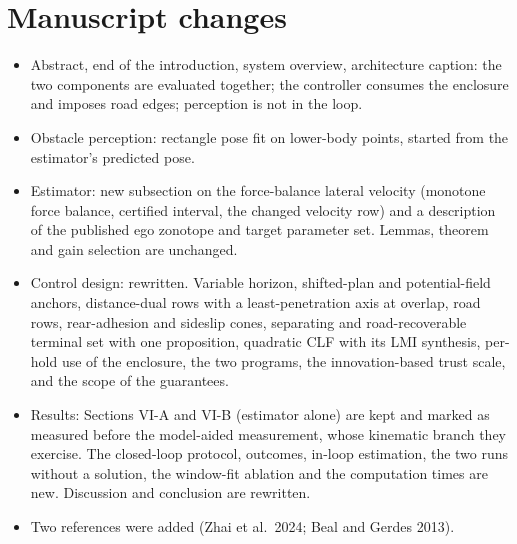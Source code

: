 \documentclass[11pt]{article}
\begin{document}
\section{Manuscript changes}
\begin{itemize}
\item Abstract, end of the introduction, system overview, architecture
  caption: the two components are evaluated together; the controller consumes
  the enclosure and imposes road edges; perception is not in the loop.
\item Obstacle perception: rectangle pose fit on lower-body points, started
  from the estimator's predicted pose.
\item Estimator: new subsection on the force-balance lateral velocity
  (monotone force balance, certified interval, the changed velocity row) and
  a description of the published ego zonotope and target parameter set.
  Lemmas, theorem and gain selection are unchanged.
\item Control design: rewritten. Variable horizon, shifted-plan and
  potential-field anchors, distance-dual rows with a least-penetration axis at
  overlap, road rows, rear-adhesion and sideslip cones, separating and
  road-recoverable terminal set with one proposition, quadratic CLF with its
  LMI synthesis, per-hold use of the enclosure, the two programs, the
  innovation-based trust scale, and the scope of the guarantees.
\item Results: Sections VI-A and VI-B (estimator alone) are kept and marked
  as measured before the model-aided measurement, whose kinematic branch they
  exercise. The closed-loop protocol, outcomes, in-loop estimation, the two
  runs without a solution, the window-fit ablation and the computation times
  are new. Discussion and conclusion are rewritten.
\item Two references were added (Zhai et al.\ 2024; Beal and Gerdes 2013).
\end{itemize}
\end{document}
